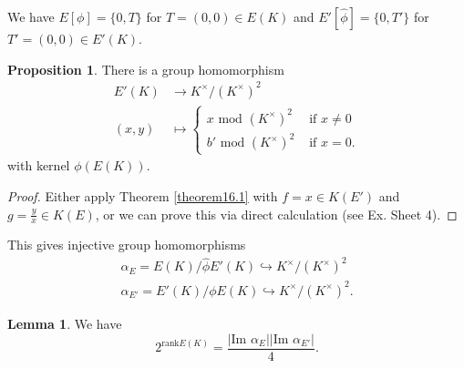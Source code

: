 \documentclass{article}
\theoremstyle{definition}
\newtheorem{lemma}[theorem]{Lemma}
\newtheorem{prop}[theorem]{Proposition}
\begin{document}
\vspace{1mm}
 
We have $E[\phi] = \{0,T\}$ for $T = (0,0) \in E(K)$ and $E'[\widehat{\phi}] = \{0,T'\}$ for $T' = (0,0) \in E'(K)$.

\begin{prop}\label{prop16.2}
    There is a group homomorphism 
    \begin{align*}
        E'(K) &\to K^\times/(K^\times)^2 \\
        (x,y) &\mapsto \begin{cases}
            x \text{ mod }(K^\times)^2 &\text{ if }x \neq 0\\
            b' \text{ mod }(K^\times)^2 &\text{ if }x = 0.
        \end{cases}
    \end{align*}    
    with kernel $\phi(E(K))$.
\end{prop}
\begin{proof}
    Either apply Theorem \ref{theorem16.1} with $f = x \in K(E')$ and $g = \frac{y}{x} \in K(E)$, or we can prove this via direct calculation (see Ex. Sheet 4).
\end{proof}
This gives injective group homomorphisms
\begin{align*}
    \alpha_E = E(K)/\widehat{\phi}E'(K) \hookrightarrow K^\times/(K^\times)^2\\
    \alpha_{E'} = E'(K)/\phi E(K) \hookrightarrow K^\times/(K^\times)^2.
\end{align*}
\begin{lemma}\label{lemma16.3}
    We have \[
    2^{\text{rank}E(K)} = \frac{\left|\text{Im }\alpha_E\right|\left|\text{Im }\alpha_{E'}\right|}{4}.
    \]
\end{lemma}
\end{document}
